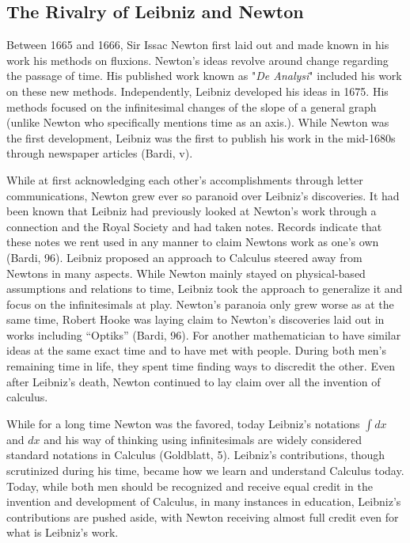 \documentclass[12pt]{article}
\begin{document}
    \subsection*{The Rivalry of Leibniz and Newton}
Between 1665 and 1666, Sir Issac Newton first laid out and made known in his work his methods on fluxions.
Newton's ideas revolve around change regarding the passage of time.
His published work known as "\textit{De Analysi}" included his work on these new methods.
Independently, Leibniz developed his ideas in 1675.
His methods focused on the infinitesimal changes of the slope of a general graph (unlike Newton who specifically mentions time as an axis.). While Newton was the first development, Leibniz was the first to publish his work in the mid-1680s through newspaper articles (Bardi, v). \par
While at first acknowledging each other's accomplishments through letter communications, Newton grew ever so paranoid over Leibniz's discoveries.
It had been known that Leibniz had previously looked at Newton's work through a connection and the Royal Society and had taken notes.
Records indicate that these notes we rent used in any manner to claim Newtons work as one's own (Bardi, 96).
Leibniz proposed an approach to Calculus steered away from Newtons in many aspects.
While Newton mainly stayed on physical-based assumptions and relations to time, Leibniz took the approach to generalize it and focus on the infinitesimals at play.
Newton's paranoia only grew worse as at the same time, Robert Hooke was laying claim to Newton's discoveries laid out in works including “Optiks” (Bardi, 96).
For another mathematician to have similar ideas at the same exact time and to have met with people.
During both men's remaining time in life, they spent time finding ways to discredit the other.
Even after Leibniz's death, Newton continued to lay claim over all the invention of calculus.\\ \par
While for a long time Newton was the favored, today Leibniz's notations $\int dx$ and $dx$ and his way of thinking using infinitesimals are widely considered standard notations in Calculus (Goldblatt, 5).
Leibniz's contributions, though scrutinized during his time, became how we learn and understand Calculus today.
Today, while both men should be recognized and receive equal credit in the invention and development of Calculus, in many instances in education, Leibniz's contributions are pushed aside, with Newton receiving almost full credit even for what is Leibniz's work.
\end{document}
